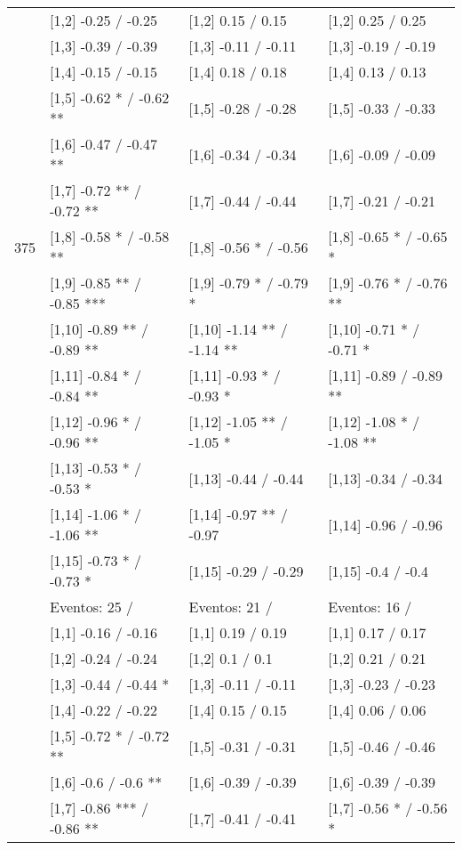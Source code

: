 \begin{table}
\begin{tabular}[t]{llll}
 & {}[1,2] -0.25  / -0.25 & {}[1,2] 0.15  / 0.15 & {}[1,2] 0.25  / 0.25\\
 & {}[1,3] -0.39  / -0.39 & {}[1,3] -0.11  / -0.11 & {}[1,3] -0.19  / -0.19\\
\addlinespace
 & {}[1,4] -0.15  / -0.15 & {}[1,4] 0.18  / 0.18 & {}[1,4] 0.13  / 0.13\\
 & {}[1,5] -0.62 * / -0.62 ** & {}[1,5] -0.28  / -0.28 & {}[1,5] -0.33  / -0.33\\
 & {}[1,6] -0.47  / -0.47 ** & {}[1,6] -0.34  / -0.34 & {}[1,6] -0.09  / -0.09\\
 & {}[1,7] -0.72 ** / -0.72 ** & {}[1,7] -0.44  / -0.44 & {}[1,7] -0.21  / -0.21\\
375 & {}[1,8] -0.58 * / -0.58 ** & {}[1,8] -0.56 * / -0.56 & {}[1,8] -0.65 * / -0.65 *\\
\addlinespace
 & {}[1,9] -0.85 ** / -0.85 *** & {}[1,9] -0.79 * / -0.79 * & {}[1,9] -0.76 * / -0.76 **\\
 & {}[1,10] -0.89 ** / -0.89 ** & {}[1,10] -1.14 ** / -1.14 ** & {}[1,10] -0.71 * / -0.71 *\\
 & {}[1,11] -0.84 * / -0.84 ** & {}[1,11] -0.93 * / -0.93 * & {}[1,11] -0.89  / -0.89 **\\
 & {}[1,12] -0.96 * / -0.96 ** & {}[1,12] -1.05 ** / -1.05 * & {}[1,12] -1.08 * / -1.08 **\\
 & {}[1,13] -0.53 * / -0.53 * & {}[1,13] -0.44  / -0.44 & {}[1,13] -0.34  / -0.34\\
\addlinespace
 & {}[1,14] -1.06 * / -1.06 ** & {}[1,14] -0.97 ** / -0.97 & {}[1,14] -0.96  / -0.96\\
 & {}[1,15] -0.73 * / -0.73 * & {}[1,15] -0.29  / -0.29 & {}[1,15] -0.4  / -0.4\\
 & Eventos:  25 / & Eventos:  21 / & Eventos:  16 /\\
 & {}[1,1] -0.16  / -0.16 & {}[1,1] 0.19  / 0.19 & {}[1,1] 0.17  / 0.17\\
 & {}[1,2] -0.24  / -0.24 & {}[1,2] 0.1  / 0.1 & {}[1,2] 0.21  / 0.21\\
\addlinespace
 & {}[1,3] -0.44  / -0.44 * & {}[1,3] -0.11  / -0.11 & {}[1,3] -0.23  / -0.23\\
 & {}[1,4] -0.22  / -0.22 & {}[1,4] 0.15  / 0.15 & {}[1,4] 0.06  / 0.06\\
 & {}[1,5] -0.72 * / -0.72 ** & {}[1,5] -0.31  / -0.31 & {}[1,5] -0.46  / -0.46\\
 & {}[1,6] -0.6  / -0.6 ** & {}[1,6] -0.39  / -0.39 & {}[1,6] -0.39  / -0.39\\
 & {}[1,7] -0.86 *** / -0.86 ** & {}[1,7] -0.41  / -0.41 & {}[1,7] -0.56 * / -0.56 *\\

\end{tabular}
\end{table}
